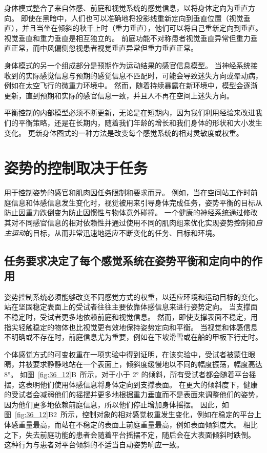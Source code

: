 身体模式整合了来自体感、前庭和视觉系统的感觉信息，以将身体定向为垂直方向。
即使在黑暗中，人们也可以准确地将投影线重新定向到垂直位置（视觉垂直），并且当坐在倾斜的秋千上时（重力垂直），他们可以将自己重新定向到垂直。
视觉垂直和重力垂直是相互独立的。
前庭功能不对称患者视觉垂直异常但重力垂直正常，而中风偏侧忽视患者视觉垂直异常但重力垂直正常。


身体模式的另一个组成部分是预期作为运动结果的感官信息模型。
当神经系统接收到的实际感觉信息与预期的感觉信息不匹配时，可能会导致迷失方向或晕动病，例如在太空飞行的微重力环境中。
然而，随着持续暴露在新环境中，模型会逐渐更新，直到预期和实际的感官信息一致，并且人不再在空间上迷失方向。


平衡控制的内部模型必须不断更新，无论是在短期内，因为我们利用经验来改进我们的平衡策略，还是在长期内，随着我们年龄的增长和我们身体的形状和大小发生变化。
更新身体图式的一种方法是改变每个感觉系统的相对灵敏度或权重。



\section{姿势的控制取决于任务}

用于控制姿势的感官和肌肉因任务限制和要求而异。
例如，当在空间站工作时前庭信息和体感信息发生变化时，视觉被用来引导身体完成任务，姿势平衡的目标从防止因重力跌倒变为防止因惯性与物体意外碰撞。
一个健康的神经系统通过修改其对不同感官信息的相对依赖性并通过使用不同的肌肉组来优化实现姿势控制和\textit{自主运动}的目标，从而非常迅速地适应不断变化的任务、目标和环境。



\subsection{任务要求决定了每个感觉系统在姿势平衡和定向中的作用}

姿势控制系统必须能够改变不同感觉方式的权重，以适应环境和运动目标的变化。
站在坚固稳定表面上的受试者往往主要依靠体感信息来进行姿势定向。
当支撑面不稳定时，受试者更多地依赖前庭和视觉信息。
然而，即使支撑表面不稳定，用指尖轻触稳定的物体也比视觉更有效地保持姿势定向和平衡。
当视觉和体感信息不明确或不存在时，前庭信息尤为重要，例如在下坡滑雪或在船的甲板下行走时。


个体感觉方式的可变权重在一项实验中得到证明，在该实验中，受试者被蒙住眼睛，并被要求静静地站在一个表面上，倾斜度缓慢地以不同的幅度振荡，幅度高达 8°。
如图~\ref{fig:36_12}B~所示，对于小于 2° 的倾斜，所有受试者都会随着平台摇摆，这表明他们使用体感信息将身体定向到支撑表面。
在更大的倾斜度下，健康的受试者会减弱他们的摇摆并更多地根据重力垂直而不是表面来调整他们的姿势，因为他们更多地依赖前庭信息，所以他们停止增加身体摇摆。
因此，如图~\ref{fig:36_12}B2~所示，控制对象的相对感觉权重发生变化，例如在稳定的平台上体感重量最高，而站在不稳定的表面上前庭重量最高，例如表面倾斜度大。
相比之下，失去前庭功能的患者会随着平台摇摆不定，随后会在大表面倾斜时跌倒。
这种行为与患者对平台倾斜的不适当自动姿势响应一致。


